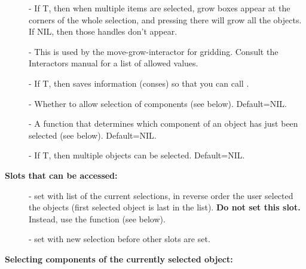 \begin{description}
\item[]     - If T, then when multiple items are selected, grow
                           boxes appear at the corners of the whole selection,
                           and pressing there will grow all the objects.
                           If NIL, then those handles don't appear.

\item[]     - This is used by the move-grow-interactor for gridding.
                        Consult the Interactors manual for a list of allowed
                        values.

\item[]     - If T, then saves information (conses) so that you can call
                     .

\item[]     - Whether to allow selection of components
                                  (see below).  Default=NIL.

\item[]     - A function that determines which
                        component of an object has just been selected
                        (see below).  Default=NIL.

\item[]     - If T, then multiple objects can be selected.
                             Default=NIL.

\end{description}


{\bf Slots that can be accessed:}

\begin{description}
\item[]     - set with list of the current selections, in reverse order
                 the user selected the objects (first selected object is
                 last in the list).  {\bf Do not set this slot.}  Instead,
                 use the function  (see below).

\item[]     - set with new selection before other
                                   slots are set.
\end{description}



{\bf Selecting components of the currently selected object:}

